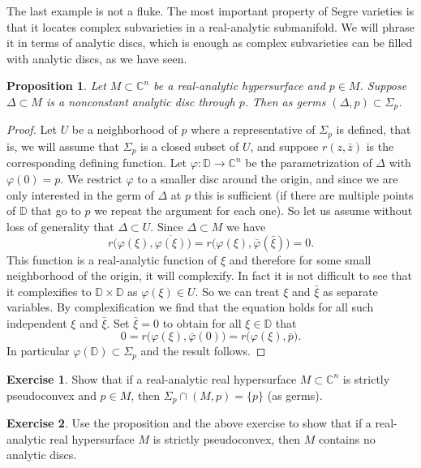 \documentclass[12pt,openany]{book}
\newcommand{\C}{{\mathbb{C}}}
\newcommand{\D}{{\mathbb{D}}}
\theoremstyle{plain}
\newtheorem{prop}[thm]{Proposition}
\theoremstyle{remark}
\theoremstyle{definition}
\newenvironment{exbox}{%
    \def\FrameCommand{\vrule width 1pt \relax\hspace {10pt}}%
    \MakeFramed {\advance \hsize -\width \FrameRestore }%
}{%
    \endMakeFramed
}
\theoremstyle{exercise}
\newtheorem{exercise}{Exercise}[section]
\theoremstyle{example}
\begin{document}
The last example is not a fluke.
The most important property of Segre varieties is that it locates complex
subvarieties in a real-analytic submanifold.
We will phrase it in terms of analytic discs, which is
enough as complex subvarieties can be filled with analytic discs,
as we have seen.

\begin{prop}
Let $M \subset \C^n$ be a real-analytic hypersurface and $p \in M$.
Suppose $\Delta \subset M$ is a nonconstant analytic disc
through $p$.  Then as germs $(\Delta,p) \subset \Sigma_p$.
\end{prop}

\begin{proof}
Let $U$ be a neighborhood of $p$ where a representative
of $\Sigma_p$ is defined, that is, we will assume that $\Sigma_p$ is
a closed subset of $U$, and suppose $r(z,\bar{z})$ is the corresponding
defining function.
Let $\varphi \colon \D \to \C^n$ be the parametrization of $\Delta$
with $\varphi(0) = p$.  We restrict $\varphi$ to a smaller disc around the
origin, and since we are only interested in the germ of $\Delta$ at $p$ this
is sufficient (if there are multiple points of $\D$
that go to $p$ we repeat the argument for each one).
So let us assume without loss of generality that $\Delta \subset U$.
Since $\Delta \subset M$ we have
\begin{equation*}
r\bigl(\varphi(\xi),\overline{\varphi(\xi)}\bigr) =
r\bigl(\varphi(\xi),\bar{\varphi}(\bar{\xi})\bigr) = 0 .
\end{equation*}
This function is a real-analytic function of $\xi$ and therefore for some
small neighborhood of the origin, it will complexify.  In fact it is not
difficult to see that it complexifies to $\D \times \D$ as $\varphi(\xi) \in
U$.  So we can treat $\xi$ and $\bar{\xi}$ as separate variables.  By
complexification we find that the equation holds for all such independent
$\xi$ and $\bar{\xi}$.  Set $\bar{\xi} = 0$ to obtain for all $\xi \in \D$
that
\begin{equation*}
0 =
r\bigl(\varphi(\xi),\bar{\varphi}(0)\bigr) =
r\bigl(\varphi(\xi),\bar{p}\bigr) .
\end{equation*}
In particular $\varphi(\D) \subset \Sigma_p$ and the result follows.
\end{proof}

\begin{exbox}
\begin{exercise}
Show that if a real-analytic real hypersurface $M \subset \C^n$ is strictly pseudoconvex and $p \in M$, then $\Sigma_p \cap
(M,p) = \{p\}$ (as germs).
\end{exercise}

\begin{exercise}
Use the proposition and the above exercise to show that if a real-analytic
real hypersurface $M$ is strictly 
pseudoconvex, then $M$ contains no analytic discs.
\end{exercise}
\end{exbox}
\end{document}
